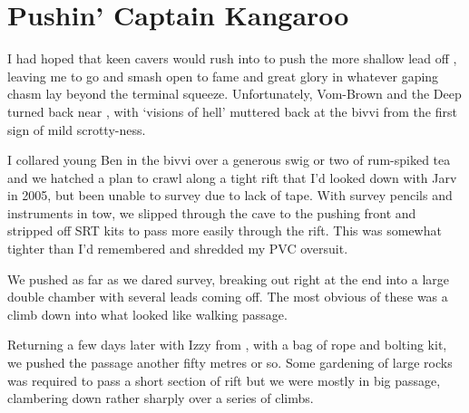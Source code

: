 

\section{Pushin' Captain Kangaroo}


I had hoped that keen cavers would rush into  to push
the more shallow lead off , leaving me to go and smash
open  to fame and great glory in whatever gaping chasm lay
beyond the terminal squeeze. Unfortunately, Vom-Brown and the Deep
turned back near , with `visions of hell' muttered back at
the bivvi from the first sign of mild scrotty-ness.

I collared young Ben in the bivvi over a generous swig or two of
rum-spiked tea and we hatched a plan to crawl along a tight rift that
I'd looked down with Jarv in 2005, but been unable to survey due to lack
of tape. With survey pencils and instruments in tow, we slipped through
the cave to the pushing front and stripped off SRT kits to pass more
easily through the rift. This was somewhat tighter than I'd remembered
and shredded my PVC oversuit.


We pushed as far as we dared survey, breaking out right at the end into a
large double chamber with several leads coming off. The most obvious of
these was a climb down into what looked like walking passage.

Returning a few days later with Izzy from , with a bag of rope and
bolting kit, we pushed the passage another fifty metres or so. Some
gardening of large rocks was required to pass a short section of rift
but we were mostly in big passage, clambering down rather sharply over a
series of climbs.

